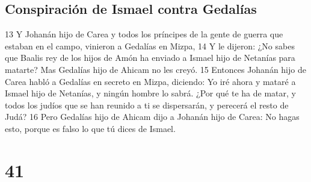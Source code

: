 \section*{Conspiración de Ismael contra Gedalías}

13 Y Johanán hijo de Carea y todos los príncipes de la gente de guerra que estaban en el campo, vinieron a Gedalías en Mizpa,
14 Y le dijeron: ¿No sabes que Baalis rey de los hijos de Amón ha enviado a Ismael hijo de Netanías para matarte? Mas Gedalías hijo de Ahicam no les creyó.
15 Entonces Johanán hijo de Carea habló a Gedalías en secreto en Mizpa, diciendo: Yo iré ahora y mataré a Ismael hijo de Netanías, y ningún hombre lo sabrá. ¿Por qué te ha de matar, y todos los judíos que se han reunido a ti se dispersarán, y perecerá el resto de Judá?
16 Pero Gedalías hijo de Ahicam dijo a Johanán hijo de Carea: No hagas esto, porque es falso lo que tú dices de Ismael.

\chapter{41}

